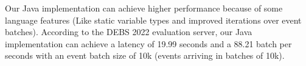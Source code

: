 
Our Java implementation can achieve higher performance because of some language features (Like static variable types and improved iterations over event batches).
According to the DEBS 2022 evaluation \cite{debs2022challenge} server, our Java implementation can achieve a latency of 19.99 seconds and a 88.21 batch per 
seconds with an event batch size of 10k (events arriving in batches of 10k).
